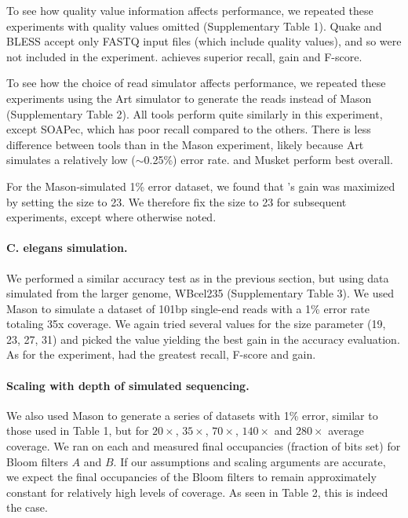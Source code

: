 \documentclass{bmcart}
\begin{document}
To see how quality value information affects performance, we repeated these experiments with quality values omitted (Supplementary Table 1).
Quake and BLESS accept only FASTQ input files (which include quality values), and so were not included in the experiment.
\tool achieves superior recall, gain and F-score.

To see how the choice of read simulator affects performance, we repeated these experiments using the Art \cite{huang2012art} simulator to generate the reads instead of Mason (Supplementary Table 2).
All tools perform quite similarly in this experiment, except SOAPec, which has poor recall compared to the others.
There is less difference between tools than in the Mason experiment, likely because Art simulates a relatively low ($\sim$0.25\%) error rate.
\tool and Musket perform best overall.

For the Mason-simulated 1\% error dataset, we found that \tool's gain was maximized by setting the \kmer size to 23.  We therefore fix the \kmer size to 23 for subsequent experiments, except where otherwise noted.

\paragraph{C. elegans simulation.}
We performed a similar accuracy test as in the previous section, but using data simulated from the larger \elegans genome, WBcel235 (Supplementary Table 3).  We used Mason to simulate a dataset of 101bp single-end reads with a 1\% error rate totaling 35x coverage.  We again tried several values for the \kmer size parameter (19, 23, 27, 31) and picked the value yielding the best gain in the accuracy evaluation.  As for the \ecoli experiment, \tool had the greatest recall, F-score and gain.

\paragraph{Scaling with depth of simulated sequencing.} We also used Mason to generate a series of datasets with 1\% error, similar to those used in Table 1, but for $20\times$, $35\times$, $70\times$, $140\times$ and $280\times$ average coverage.  We ran \tool on each and measured final occupancies (fraction of bits set) for Bloom filters $A$ and $B$.  If our assumptions and scaling arguments are accurate, we expect the final occupancies of the Bloom filters to remain approximately constant for relatively high levels of coverage.  As seen in Table 2, this is indeed the case.  
\end{document}
